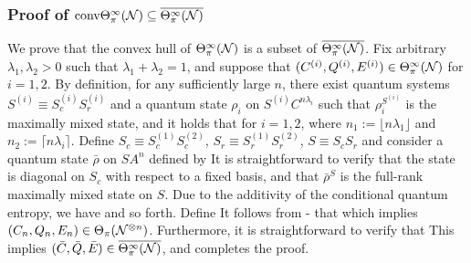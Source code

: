 \documentclass[journal]{IEEEtran}
\begin{document}
\begin{lmm}
\begin{lmm}
\subsubsection{Proof of ${\rm conv}\Theta_{\pi}^{\infty}({\mathcal N})\subseteq\overline{\Theta_{\pi}^{\infty}({\mathcal N})}$}

We prove that the convex hull of $\Theta_{\pi}^{\infty}({\mathcal N})$ is a subset of $\overline{\Theta_{\pi}^{\infty}({\mathcal N})}$.
Fix arbitrary $\lambda_1,\lambda_2>0$ such that $\lambda_1+\lambda_2=1$, and suppose that $(C^{(i)},Q^{(i)},E^{(i)})\in\Theta_{\pi}^{\infty}({\mathcal N})$ for $i=1,2$.
By definition, for any sufficiently large $n$, there exist quantum systems $S^{(i)}\equiv S_c^{(i)}S_r^{(i)}$ and a quantum state $\rho_i$ on $S^{(i)}C^{n\lambda_i}$ such that $\rho_i^{S^{(i)}}$ is the maximally mixed state, and it holds that
for $i=1,2$, where $n_1:=\lfloor n\lambda_1\rfloor$ and $n_2:=\lceil n\lambda_i\rceil$.
Define $S_c\equiv S_c^{(1)}S_c^{(2)}$, $S_r \equiv  S_r^{(1)}S_r^{(2)}$, $S\equiv S_cS_r$ and consider a quantum state $\bar{\rho}$ on $SA^n$ defined by
It is straightforward to verify that the state is diagonal on $S_c$ with respect to a fixed basis, and that $\bar{\rho}^{S}$ is the full-rank maximally mixed state on $S$. 
Due to the additivity of the conditional quantum entropy, we have
and so forth. 
Define 
It follows from - that
which implies $(C_n,Q_n,E_n)\in\Theta_{\pi}({\mathcal N}^{\otimes n})$.
Furthermore, it is straightforward to verify that
This implies $(\bar{C},\bar{Q},\bar{E})\in\overline{\Theta_{\pi}^\infty({\mathcal N})}$, and completes the proof.
\QED



\end{lmm}
\end{lmm}
\end{document}
